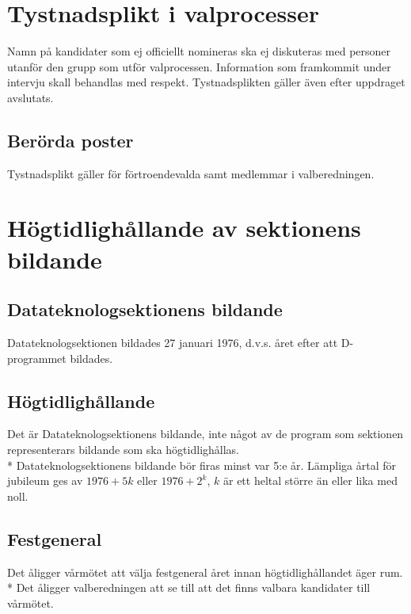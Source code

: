 \documentclass{datateknologsektionen-document}
\begin{document}
\section{Tystnadsplikt i valprocesser}
Namn på kandidater som ej officiellt nomineras ska ej diskuteras med personer utanför den grupp
som utför valprocessen. Information som framkommit under intervju skall behandlas med respekt.
Tystnadsplikten gäller även efter uppdraget avslutats.
\subsection{Berörda poster}
Tystnadsplikt gäller för förtroendevalda samt medlemmar i valberedningen.
\section{Högtidlighållande av sektionens bildande}
\subsection{Datateknologsektionens bildande}
Datateknologsektionen bildades 27 januari 1976, d.v.s. året efter att D-programmet bildades.

\subsection{Högtidlighållande}
Det är Datateknologsektionens bildande, inte något av de program som sektionen representerars
bildande som ska högtidlighållas.\\*
Datateknologsektionens bildande bör firas minst var 5:e år. Lämpliga årtal för jubileum ges av \(1976
+ 5k\) eller \(1976 + 2^k\), \(k\) är ett heltal större än eller lika med noll.
\subsection{Festgeneral}
\label{hogtid}
Det åligger vårmötet att välja festgeneral året innan högtidlighållandet äger rum.\\*
Det åligger valberedningen att se till att det finns valbara kandidater till vårmötet.
\end{document}
